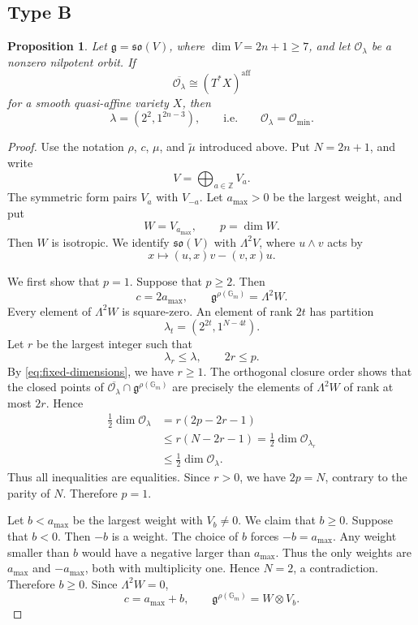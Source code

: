 \documentclass[10pt,a4paper]{amsart}
\newtheorem{proposition}[theorem]{Proposition}
\newcommand{\Gm}{\mathbb G_m}
\newcommand{\aff}{\mathrm{aff}}
\begin{document}
\subsection{Type B}\label{sec:typeB}

\begin{proposition}\label{prop:typeB}
Let $\mathfrak g=\mathfrak{so}(V)$, where $\dim V=2n+1\geq7$, and
let $\mathcal O_\lambda$ be a nonzero nilpotent orbit. If
\[
\overline{\mathcal O_\lambda}\cong(T^*X)^{\aff}
\]
for a smooth quasi-affine variety $X$, then
\[
\lambda=(2^2,1^{2n-3}),
\qquad\text{i.e.}\qquad
\mathcal O_\lambda=\mathcal O_{\min}.
\]
\end{proposition}

\begin{proof}
Use the notation $\rho$, $c$, $\mu$, and $\widetilde{\mu}$ introduced
above. Put $N=2n+1$, and write
\[
V=\bigoplus_{a\in\mathbb Z}V_a.
\]
The symmetric form pairs $V_a$ with $V_{-a}$. Let $a_{\max}>0$ be the
largest weight, and put
\[
W=V_{a_{\max}},\qquad p=\dim W.
\]
Then $W$ is isotropic. We identify $\mathfrak{so}(V)$ with
$\Lambda^2V$, where $u\wedge v$ acts by
\[
x\longmapsto (u,x)v-(v,x)u.
\]

We first show that $p=1$. Suppose that $p\geq2$. Then
\[
c=2a_{\max},
\qquad
\mathfrak g^{\rho(\Gm)}=\Lambda^2W.
\]
Every element of $\Lambda^2W$ is square-zero. An element of rank $2t$
has partition
\[
\lambda_t=(2^{2t},1^{N-4t}).
\]
Let $r$ be the largest integer such that
\[
\lambda_r\leq\lambda,
\qquad
2r\leq p.
\]
By \eqref{eq:fixed-dimensions}, we have $r\geq1$. The orthogonal
closure order \cite{KP} shows that the closed points of
$\overline{\mathcal O_\lambda}\cap\mathfrak g^{\rho(\Gm)}$
are precisely the elements of $\Lambda^2W$ of rank at most $2r$.
Hence
\[
\begin{aligned}
\frac12\dim\mathcal O_\lambda
&=r(2p-2r-1)\\
&\leq r(N-2r-1)
=\frac12\dim\mathcal O_{\lambda_r}\\
&\leq\frac12\dim\mathcal O_\lambda.
\end{aligned}
\]
Thus all inequalities are equalities. Since $r>0$, we have $2p=N$,
contrary to the parity of $N$. Therefore $p=1$.

Let $b<a_{\max}$ be the largest weight with $V_b\ne0$. We claim that
$b\geq0$. Suppose that $b<0$. Then $-b$ is a weight. The choice of
$b$ forces $-b=a_{\max}$. Any weight smaller than $b$ would have a
negative larger than $a_{\max}$. Thus the only weights are
$a_{\max}$ and $-a_{\max}$, both with multiplicity one. Hence $N=2$,
a contradiction. Therefore $b\geq0$. Since $\Lambda^2W=0$,
\[
c=a_{\max}+b,
\qquad
\mathfrak g^{\rho(\Gm)}=W\otimes V_b.
\]


\end{proof}
\end{document}
